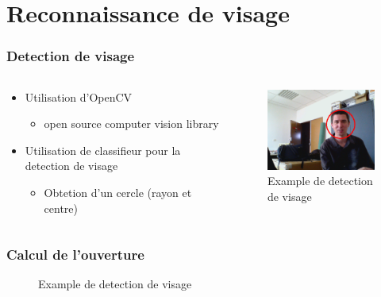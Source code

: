 \section{Reconnaissance de visage}
\begin{frame}
  \frametitle{Detection de visage}
  \begin{columns}[c]
    \begin{column}[T]{.5\textwidth}
      \begin{itemize}
        \item Utilisation d'OpenCV
          \begin{itemize}
            \item open source computer vision library
          \end{itemize}
        \item Utilisation de classifieur pour la detection de visage
          \begin{itemize}
            \item Obtetion d'un cercle (rayon et centre)
          \end{itemize}
      \end{itemize}
    \end{column}
    \begin{column}[T]{.5\textwidth}
      \begin{figure}
        \begin{center}
          \includegraphics[width=5cm]{image/faceDetection.png}
          \caption{Example de detection de visage}
        \end{center}
      \end{figure}
    \end{column}
  \end{columns}   
\end{frame}

\begin{frame}
  \frametitle{Calcul de l'ouverture}
  \begin{figure}
    \begin{columns}[c]
      \begin{column}[T]{.5\textwidth}
        
      \end{column}
      \begin{column}[T]{.5\textwidth}
        
      \end{column}
    \end{columns}   
    \caption{Example de detection de visage}
  \end{figure}
\end{frame}
